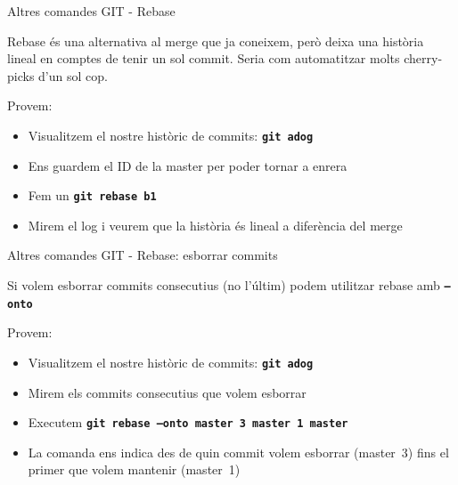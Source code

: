 \documentclass[10pt,xcolor={rgb}]{beamer}
\begin{document}
    \begin{frame}[fragile]{Altres comandes GIT - Rebase}

      Rebase és una alternativa al merge que ja coneixem, però deixa una història lineal en comptes de tenir un sol commit.  Seria com automatitzar molts cherry-picks d'un sol cop.
      \begin{block}{Provem:}
      \begin{itemize}
        \item Visualitzem el nostre històric de commits: \texttt{\textbf{git adog}}
        \item Ens guardem el ID de la master per poder tornar a enrera
        \item Fem un \texttt{\textbf{git rebase b1}}
        \item Mirem el log i veurem que la història és lineal a diferència del merge
      \end{itemize}
      \end{block}
    \end{frame}

    \begin{frame}[fragile]{Altres comandes GIT - Rebase: esborrar commits}

      Si volem esborrar commits consecutius (no l'últim) podem utilitzar rebase amb \texttt{\textbf{--onto}}
      \begin{block}{Provem:}
      \begin{itemize}
        \item Visualitzem el nostre històric de commits: \texttt{\textbf{git adog}}
        \item Mirem els commits consecutius que volem esborrar
        \item Executem \texttt{\textbf{git rebase --onto master~3 master~1 master}}
        \item La comanda ens indica des de quin commit volem esborrar (master~3) fins el primer que volem mantenir (master~1)
      \end{itemize}
      \end{block}
    \end{frame}
\end{document}

